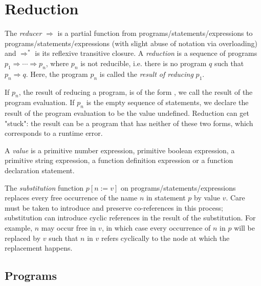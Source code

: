 

\section*{Reduction}

The \emph{reducer} $\Rightarrow$ is a partial function from
programs/statements/expressions to
programs/statements/expressions (with slight abuse of notation
via overloading)
and $\Rightarrow^*$ is its reflexive transitive closure.
A \emph{reduction} is a sequence of programs
$p_1 \Rightarrow \cdots \Rightarrow p_n$,
where $p_n$ is not reducible, i.e. there is no
program $q$ such that $p_n \Rightarrow q$.
Here, the program $p_n$ is called the \emph{result
of reducing} $p_1$.

If $p_n$, the result of reducing a program, is of the form , 
we call  the result of the program evaluation. If $p_n$ is the empty
sequence of statements, we declare the result of the program evaluation to be
the value undefined. Reduction can get "stuck": the result can be a program
that has neither of these two forms, which corresponds to a runtime error.

A \emph{value} is a primitive number expression,
primitive boolean expression,
a primitive string expression, a function definition
expression or a function declaration statement.

The \emph{substitution} function
$p [ n := v ]$ on programs/statements/expressions
replaces every free occurrence of the name $n$
in statement $p$ by value $v$. Care must be taken to introduce
and preserve
co-references in this process; substitution can introduce
cyclic references in the result of the substitution. For example,
$n$ may occur free in $v$, in which case
every occurrence of $n$ in $p$
will be replaced by $v$ such that $n$ in $v$ refers cyclically
to the node at which the replacement happens.

\subsection*{Programs}



